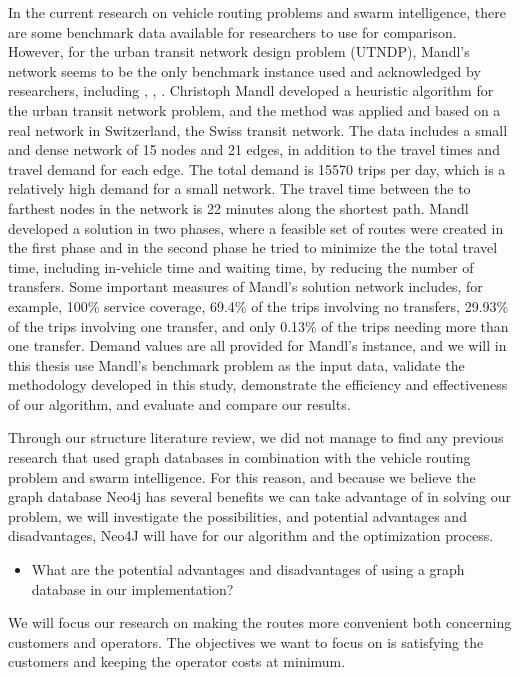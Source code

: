 In the current research on vehicle routing problems and swarm intelligence, there are some benchmark data available for researchers to use for comparison. However, for the urban transit network design problem (UTNDP), Mandl's network seems to be the only benchmark instance used and acknowledged by researchers, including \citep{fan09}, \citep{kechagiopoulos14}, \citep{nikolic14}. Christoph Mandl \citep{mandl79} developed a heuristic algorithm for the urban transit network problem, and the method was applied and based on a real network in Switzerland, the Swiss transit network\citep{mandl80}. The data includes a small and dense network of 15 nodes and 21 edges, in addition to the travel times and travel demand for each edge. The total demand is 15570 trips per day, which is a relatively high demand for a small network. The travel time between the to farthest nodes in the network is 22 minutes along the shortest path. Mandl developed a solution in two phases, where a feasible set of routes were created in the first phase and in the second phase he tried to minimize the the total travel time, including in-vehicle time and waiting time, by reducing the number of transfers. Some important measures of Mandl's solution network includes, for example, 100\% service coverage, 69.4\% of the trips involving no transfers, 29.93\% of the trips involving one transfer, and only 0.13\% of the trips needing more than one transfer. Demand values are all provided for Mandl's instance, and we will in this thesis use Mandl's benchmark problem \citep{mandl79} as the input data, validate the methodology developed in this study, demonstrate the efficiency and effectiveness of our algorithm, and evaluate and compare our results. 

Through our structure literature review, we did not manage to find any previous research that used graph databases in combination with the vehicle routing problem and swarm intelligence. For this reason, and because we believe the graph database Neo4j \citep{website:neo4j} has several benefits we can take advantage of in solving our problem, we will investigate the possibilities, and potential advantages and disadvantages, Neo4J will have for our algorithm and the optimization process.
\begin{itemize}
\item What are the potential advantages and disadvantages of using a graph database in our implementation?
\end{itemize}

We will focus our research on making the routes more convenient both concerning customers and operators. The objectives we want to focus on is satisfying the customers and keeping the operator costs at minimum. 

